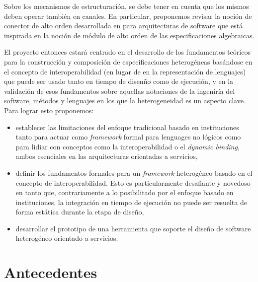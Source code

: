 \documentclass[a4paper, 11pt]{article}
\begin{document}
  Sobre los mecanismos de estructuración, se debe tener en cuenta que los mismos deben operar también en canales. En particular, proponemos revisar la noción de conector de alto orden desarrollada en \cite{lopez+:acmtosem-12_1} para arquitecturas de software que está inspirada en la noción de módulo de alto orden de las especificaciones algebraicas.
  
  El proyecto entonces estará centrado en el desarrollo de los fundamentos teóricos para la construcción y composición de especificaciones heterogéneas basándose en el concepto de interoperabilidad (en lugar de en la representación de lenguajes) que puede ser usado tanto en tiempo de disenño como de ejecución, y en la validación de esos fundamentos sobre aquellas notaciones de la ingeniría del software, métodos y lenguajes en los que la heterogeneidad es un aspecto clave. Para lograr esto proponemos:

  \begin{itemize}
  \item establecer las limitaciones del enfoque tradicional basado en instituciones tanto para actuar como \emph{framework} formal para lenguages no lógicos como para lidiar con conceptos como la interoperabilidad o el \emph{dynamic binding}, ambos esenciales en las arquitecturas orientadas a servicios,
  
  \item definir los fundamentos formales para un \emph{framework} heterogéneo basado en el concepto de interoperabilidad. Esto es particularmente desafiante y novedoso en tanto que, contrariamente a lo posibilitado por el enfoque basado en instituciones, la integración en tiempo de ejecución no puede ser resuelta de forma estática durante la etapa de diseño,
  
  \item desarrollar el prototipo de una herramienta que soporte el diseño de software heterogéneo orientado a servicios.
  \end{itemize}

\section{Antecedentes}

\newcommand{\paperola}{\emph{An Abstract Heterogeneous Characterization of Component Based Systems in a Categorical Setting}}
\end{document}
